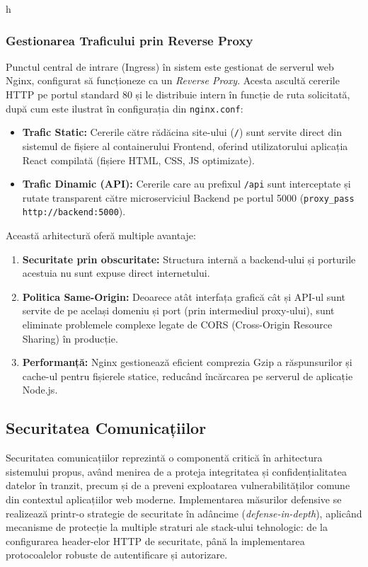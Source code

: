 h\documentclass[12pt,a4paper]{article}
\begin{document}
\subsubsection{Gestionarea Traficului prin Reverse Proxy}
\hspace{1em} Punctul central de intrare (Ingress) în sistem este gestionat de serverul web Nginx, configurat să funcționeze ca un \textit{Reverse Proxy}. Acesta ascultă cererile HTTP pe portul standard 80 și le distribuie intern în funcție de ruta solicitată, după cum este ilustrat în configurația din \texttt{nginx.conf}: 
\begin{itemize} 
    \item \textbf{Trafic Static:} Cererile către rădăcina site-ului (\texttt{/}) sunt servite direct din sistemul de fișiere al containerului Frontend, oferind utilizatorului aplicația React compilată (fișiere HTML, CSS, JS optimizate). 
    \item \textbf{Trafic Dinamic (API):} Cererile care au prefixul \texttt{/api} sunt interceptate și rutate transparent către microserviciul Backend pe portul 5000 (\texttt{proxy\_pass http://backend:5000}).
\end{itemize}

Această arhitectură oferă multiple avantaje: 
\begin{enumerate}
    \item \textbf{Securitate prin obscuritate:} Structura internă a backend-ului și porturile acestuia nu sunt expuse direct internetului. 
    \item \textbf{Politica Same-Origin:} Deoarece atât interfața grafică cât și API-ul sunt servite de pe același domeniu și port (prin intermediul proxy-ului), sunt eliminate problemele complexe legate de CORS (Cross-Origin Resource Sharing) în producție. 
    \item \textbf{Performanță:} Nginx gestionează eficient comprezia Gzip a răspunsurilor și cache-ul pentru fișierele statice, reducând încărcarea pe serverul de aplicație Node.js. 
\end{enumerate}

\subsection{Securitatea Comunicațiilor}
\label{subsec:securitate_comunicatii}

\hspace{1em} Securitatea comunicațiilor reprezintă o componentă critică în arhitectura sistemului propus, având menirea de a proteja integritatea și confidențialitatea datelor în tranzit, precum și de a preveni exploatarea vulnerabilităților comune din contextul aplicațiilor web moderne. Implementarea măsurilor defensive se realizează printr-o strategie de securitate în adâncime (\textit{defense-in-depth}), aplicând mecanisme de protecție la multiple straturi ale stack-ului tehnologic: de la configurarea header-elor HTTP de securitate, până la implementarea protocoalelor robuste de autentificare și autorizare. 
\end{document}
